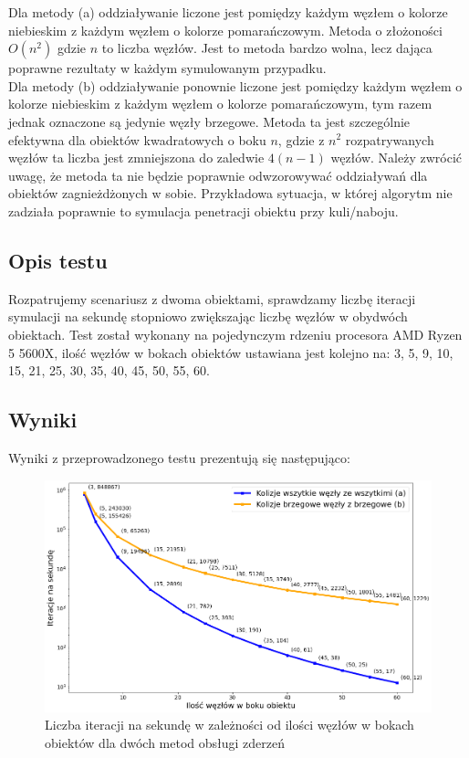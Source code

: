 \documentclass[12pt, letterpaper]{report}
\begin{document}
    Dla metody (a) oddziaływanie liczone jest pomiędzy każdym węzłem o kolorze niebieskim z każdym węzłem o
    kolorze pomarańczowym. Metoda o złożoności $O(n^2)$ gdzie $n$ to liczba węzłów.
    Jest to metoda bardzo wolna, lecz dająca poprawne rezultaty w każdym symulowanym przypadku.\\

    Dla metody (b) oddziaływanie ponownie liczone jest pomiędzy każdym węzłem o kolorze niebieskim z każdym
    węzłem o kolorze pomarańczowym, tym razem jednak oznaczone są jedynie węzły brzegowe.
    Metoda ta jest szczególnie efektywna dla obiektów kwadratowych o boku $n$, gdzie z $n^2$
    rozpatrywanych węzłów ta liczba jest zmniejszona do zaledwie $4(n-1)$ węzłów.
    Należy zwrócić uwagę, że metoda ta nie będzie poprawnie odwzorowywać oddziaływań dla
    obiektów zagnieżdżonych w sobie. Przykładowa sytuacja, w której algorytm nie zadziała poprawnie
    to symulacja penetracji obiektu przy kuli/naboju.

    \subsection{Opis testu}
    Rozpatrujemy scenariusz z dwoma obiektami, sprawdzamy liczbę iteracji symulacji na sekundę stopniowo
    zwiększając liczbę węzłów w obydwóch obiektach. Test został wykonany na pojedynczym rdzeniu procesora AMD Ryzen 5 5600X, 
    ilość węzłów w bokach obiektów ustawiana jest kolejno na: 3, 5, 9, 10, 15, 21, 25, 30, 35, 40, 45, 50, 55, 60.
    
    \newpage
    \subsection{Wyniki}
    Wyniki z przeprowadzonego testu prezentują się następująco:
    \begin{figure}[H]
        \centering
        \includegraphics[width=15cm]{performance_side_size}
        \caption{
            Liczba iteracji na sekundę w zależności od 
            ilości węzłów w bokach obiektów dla dwóch metod obsługi zderzeń
        }
    \end{figure}
\end{document}
